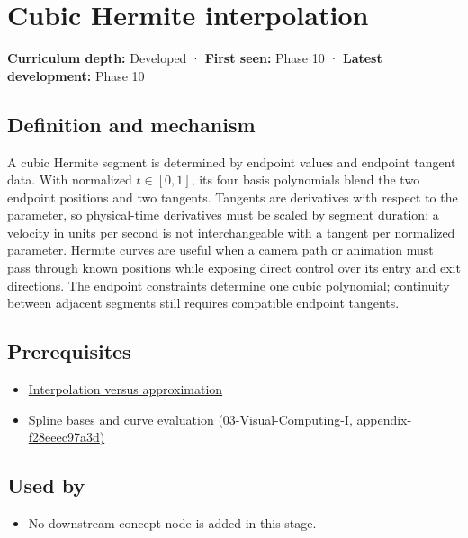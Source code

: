 \hypertarget{appendix-db3aef8f2fd6}{}
\section{Cubic Hermite interpolation}\label{appendix-db3aef8f2fd6-cubic-hermite-interpolation}

\textbf{Curriculum depth:} Developed · \textbf{First seen:} Phase 10 · \textbf{Latest development:} Phase 10

\subsection{Definition and mechanism}\label{appendix-db3aef8f2fd6-definition-and-mechanism}

A cubic Hermite segment is determined by endpoint values and endpoint tangent data. With normalized \(t\in[0,1]\), its four basis polynomials blend the two endpoint positions and two tangents. Tangents are derivatives with respect to the parameter, so physical-time derivatives must be scaled by segment duration: a velocity in units per second is not interchangeable with a tangent per normalized parameter. Hermite curves are useful when a camera path or animation must pass through known positions while exposing direct control over its entry and exit directions. The endpoint constraints determine one cubic polynomial; continuity between adjacent segments still requires compatible endpoint tangents.

\subsection{Prerequisites}\label{appendix-db3aef8f2fd6-prerequisites}

\begin{itemize}
\tightlist
\item
  \hyperref[appendix-0c2a5f69851e]{Interpolation versus approximation}
\item
  \href{../03-Visual-Computing-I/main.pdf\#nameddest=appendix-f28eeec97a3d}{Spline bases and curve evaluation (03-Visual-Computing-I, appendix-f28eeec97a3d)}
\end{itemize}

\subsection{Used by}\label{appendix-db3aef8f2fd6-used-by}

\begin{itemize}
\tightlist
\item
  No downstream concept node is added in this stage.
\end{itemize}

